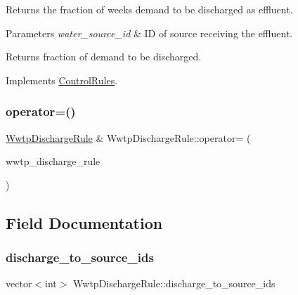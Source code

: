 Returns the fraction of week\textquotesingle{}s demand to be discharged as effluent. 
\begin{DoxyParams}{Parameters}
{\em water\+\_\+source\+\_\+id} & ID of source receiving the effluent. \\
\hline
\end{DoxyParams}
\begin{DoxyReturn}{Returns}
fraction of demand to be discharged. 
\end{DoxyReturn}


Implements \mbox{\hyperlink{classControlRules_a3d4b00d92729c6662473fc25707c0d9b_a3d4b00d92729c6662473fc25707c0d9b}{Control\+Rules}}.

\mbox{\label{classWwtpDischargeRule_acde020b347aff843179a318a9d231c8f_acde020b347aff843179a318a9d231c8f}} 
\subsubsection{\texorpdfstring{operator=()}{operator=()}}
{\footnotesize\ttfamily \mbox{\hyperlink{classWwtpDischargeRule}{Wwtp\+Discharge\+Rule}} \& Wwtp\+Discharge\+Rule\+::operator= (\begin{DoxyParamCaption}\item[{const \mbox{\hyperlink{classWwtpDischargeRule}{Wwtp\+Discharge\+Rule}} \&}]{wwtp\+\_\+discharge\+\_\+rule }\end{DoxyParamCaption})}



\subsection{Field Documentation}
\mbox{\label{classWwtpDischargeRule_ac2f77a9fca93eef3fd26ff1d579130be_ac2f77a9fca93eef3fd26ff1d579130be}} 
\subsubsection{\texorpdfstring{discharge\+\_\+to\+\_\+source\+\_\+ids}{discharge\_to\_source\_ids}}
{\footnotesize\ttfamily vector$<$int$>$ Wwtp\+Discharge\+Rule\+::discharge\+\_\+to\+\_\+source\+\_\+ids}

